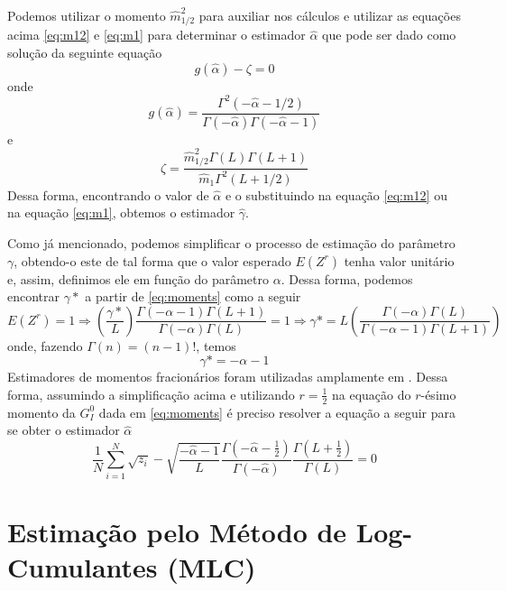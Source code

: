 \documentclass[12pt]{article}
\begin{document}
Podemos utilizar o momento $\widehat{m}_{1/2}^2$ para auxiliar nos cálculos e utilizar as equações acima \eqref{eq:m12} e \eqref{eq:m1} para determinar o estimador $\widehat{\alpha}$ que pode ser dado como solução da seguinte equação
\begin{equation}
    g(\widehat{\alpha}) - \zeta = 0
\end{equation}
onde 
\begin{equation}
    g(\widehat{\alpha}) = \frac{\Gamma^2(-\widehat{\alpha} - 1/2)}{\Gamma(-\widehat{\alpha})\Gamma(-\widehat{\alpha} - 1)}
\end{equation}
e
\begin{equation}
    \zeta = \frac{\widehat{m}_{1/2}^2\Gamma(L)\Gamma(L+1)}{\widehat{m}_{1}\Gamma^2(L+1/2)}
\end{equation}
Dessa forma, encontrando o valor de $\widehat{\alpha}$ e o substituindo na equação \eqref{eq:m12} ou na equação \eqref{eq:m1}, obtemos o estimador $\widehat{\gamma}$.

Como já mencionado, podemos simplificar o processo de estimação do parâmetro $\gamma$, obtendo-o este de tal forma que o valor esperado $E(Z^r)$ tenha valor unitário e, assim, definimos ele em função do parâmetro $\alpha$. Dessa forma, podemos encontrar $\gamma*$ a partir de \eqref{eq:moments} como a seguir
\begin{equation}
    E(Z^r) = 1 \Rightarrow \left (\frac{\gamma*}{L}\right ) \frac{\Gamma(-\alpha-1)\Gamma(L+1)}{\Gamma(-\alpha)\Gamma(L)} = 1 \Rightarrow \gamma* = L\left ( \frac{\Gamma(-\alpha)\Gamma(L)}{\Gamma(-\alpha-1)\Gamma(L+1)} \right ) 
\end{equation}
onde, fazendo $\Gamma(n) = (n-1)!$, temos
\begin{equation}
    \gamma* = -\alpha - 1
\end{equation}
Estimadores de momentos fracionários foram utilizadas amplamente em \citet{Clutter1997}. Dessa forma, assumindo a simplificação acima e utilizando $r=\frac{1}{2}$ na equação do $r$-ésimo momento da $G_I^0$ dada em \eqref{eq:moments} é preciso resolver a equação a seguir para se obter o estimador $\widehat{\alpha}$
\begin{equation}
    \frac{1}{N}\sum_{i=1}^{N}\sqrt{z_i}-\sqrt{\frac{-\widehat{\alpha} - 1}{L}}\frac{\Gamma(-\widehat{\alpha} - \frac{1}{2})}{\Gamma(-\widehat{\alpha})}\frac{\Gamma(L+\frac{1}{2})}{\Gamma(L)} = 0 \label{fractional_moments}
\end{equation}

\section{Estimação pelo Método de Log-Cumulantes (MLC)}
\end{document}
